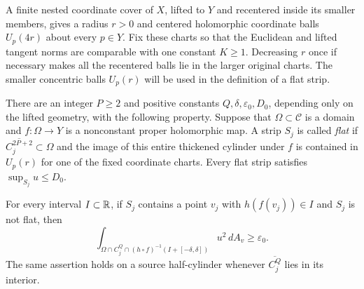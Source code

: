 A finite nested coordinate cover of $X$, lifted to $Y$ and recentered
inside its smaller members, gives a radius $r>0$ and centered
holomorphic coordinate balls $U_p(4r)$ about every $p\in Y$.
Fix these charts so that the Euclidean and lifted tangent norms are
comparable with one constant $K\geq1$. Decreasing $r$ once if necessary
makes all the recentered balls lie in the larger original charts.
The smaller concentric balls $U_p(r)$ will be used in the definition
of a flat strip.

\begin{lemma}
\label{cylinder:small-energy}
There are an integer $P\geq2$ and positive constants
$Q,\delta,\varepsilon_0,D_0$, depending only on the lifted geometry,
with the following property.  Suppose that $\Omega\subset\mathcal C$
is a domain and $f:\Omega\to Y$ is a nonconstant proper holomorphic
map. A strip $S_j$ is called \emph{flat} if
$\overline{C_j^{2P+2}}\subset\Omega$ and the image of this entire
thickened cylinder under $f$ is contained in $U_p(r)$ for one of the
fixed coordinate charts. Every flat
strip satisfies $\sup_{S_j}u\leq D_0$.

For every interval $I\subset\mathbb R$, if $S_j$ contains a point $v_j$
with $h(f(v_j))\in I$ and $S_j$ is not flat, then
\begin{equation}\label{cylinder:energy-cost}
 \int_{\Omega\cap C_j^Q\cap(h\circ f)^{-1}(I+[-\delta,\delta])}
              u^2\,dA_v\geq\varepsilon_0.
\end{equation}
The same assertion holds on a source half-cylinder whenever
$\overline{C_j^Q}$ lies in its interior.
\end{lemma}

